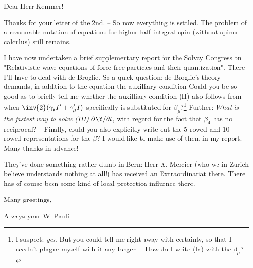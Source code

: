 \date{May 5, 1939}

Dear Herr Kemmer!

Thanks for your letter of the 2nd. -- So now everything is settled. The problem of a reasonable notation of equations for higher half-integral spin (without spinor calculus) still remains.

I have now undertaken a brief supplementary report for the Solvay Congress on "Relativistic wave equations of force-free particles and their quantization". There I'll have to deal with de Broglie. So a quick question: de Broglie's theory demands, in addition to the equation
the auxilliary condition
Could you be so good as to briefly tell me whether the auxilliary condition (II) also follows from
when $\inv{2}(\gamma_\mu I' + \gamma'_\mu I)$ specifically is substituted for $\beta_\mu$?\footnote{I suspect: \textit{yes}. But you could tell me right away with certainty, so that I needn't plague myself with it any longer. -- How do I write (Ia) with the $\beta_\mu$?} Further: \textit{What is the fastest way to solve (III)  $\partial\Y/\partial t$}, with regard for the fact that $\beta_4$ has no reciprocal? -- Finally, could you also explicitly write out the 5-rowed and 10-rowed representations for the $\beta$? I would like to make use of them in my report. Many thanks in advance!

They've done something rather dumb in Bern: Herr A. Mercier (who we in Zurich believe understands nothing at all!) has received an Extraordinariat there. There has of course been some kind of local protection influence there.

Many greetings, 

Always your W. Pauli
